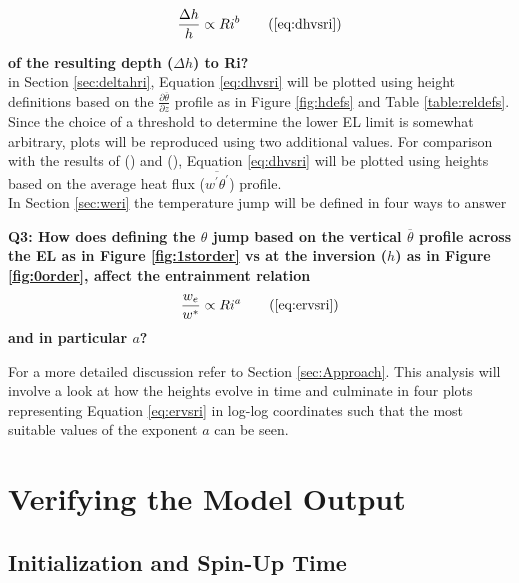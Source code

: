 \begin{equation}
\frac{\Delta h}{h} \propto Ri^{b}\tag{\ref{eq:dhvsri}}
\end{equation}

\textbf{of the resulting depth ($\Delta h$) to \acs{Ri}?}\\

in Section \ref{sec:deltahri}, Equation \ref{eq:dhvsri} will be plotted using height definitions based on the $\frac{\partial \overline{\theta}}{\partial z}$ profile as in Figure \ref{fig:hdefs} and Table \ref{table:reldefs}.  Since the choice of a threshold to determine the lower \acs{EL} limit is somewhat arbitrary, plots will be reproduced using two additional values. For comparison with the results of \citeauthor{FedConzMir04} (\citeyear{FedConzMir04}) and \citeauthor{BrooksFowler2} (\citeyear{BrooksFowler2}), Equation \ref{eq:dhvsri} will be plotted using heights based on the average heat flux ($\overline{w^{'}\theta^{'}}$) profile.\\   

In Section \ref{sec:weri} the temperature jump will be defined in four ways to answer 

\textbf{Q3: How does defining the $\theta$ jump based on the vertical $\overline{\theta}$ profile across the \acs{EL} as in Figure \ref{fig:1storder} vs at the inversion ($h$) as in Figure \ref{fig:0order}, affect the entrainment relation} 
\begin{equation}
\frac{w_{e}}{w^{*}} \propto Ri^{a} \tag{\ref{eq:ervsri}}
\end{equation}
\textbf{and in particular $a$?}

For a more detailed discussion refer to Section \ref{sec:Approach}.  This analysis will involve a look at how the heights evolve in time and culminate in four plots representing Equation \ref{eq:ervsri} in log-log coordinates such that the most suitable values of the exponent $a$ can be seen. 
\\ 

\clearpage

\section{Verifying the Model Output}
\label{sec:CheckingtheModel}
\subsection{Initialization and Spin-Up Time}%
\FloatBarrier

